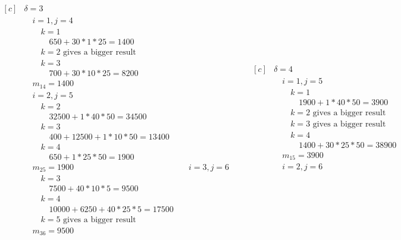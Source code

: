 \documentclass[a4paper]{article}
\begin{document}
\begin{enumerate}
  \begin{equation*}
    \begin{aligned}[c]
      &\delta=3 \\
      &\quad i=1, j=4 \\
      &\quad \quad k=1 \\
      &\quad \quad \quad 650 + 30*1*25=1400 \\
      &\quad \quad k=2 \text{ gives a bigger result} \\
      &\quad \quad k=3 \\
      &\quad \quad \quad 700+30*10*25=8200 \\
      &\quad m_{14} = 1400 \\
      &\quad i=2, j=5 \\
      &\quad \quad k=2 \\
      &\quad \quad \quad 32500+1*40*50=34500 \\
      &\quad \quad k=3 \\
      &\quad \quad \quad 400+12500+1*10*50=13400 \\
      &\quad \quad k=4 \\
      &\quad \quad \quad 650+1*25*50=1900 \\
      &\quad m_{25}=1900
      &\quad i=3, j=6 \\
      &\quad \quad k=3 \\
      &\quad \quad \quad 7500+40*10*5=9500 \\
      &\quad \quad k=4 \\
      &\quad \quad \quad 10000+6250+40*25*5=17500 \\
      &\quad \quad k=5 \text{ gives a bigger result} \\
      &\quad m_{36}=9500
    \end{aligned}
    \quad \quad
    \begin{aligned}[c]
      &\delta=4 \\
      &\quad i=1, j=5 \\
      &\quad \quad k=1 \\
      &\quad \quad \quad 1900+1*40*50=3900 \\
      &\quad \quad k=2 \text{ gives a bigger result} \\
      &\quad \quad k=3 \text{ gives a bigger result} \\
      &\quad \quad k=4 \\
      &\quad \quad \quad 1400+30*25*50=38900 \\
      &\quad m_{15} = 3900 \\
      &\quad i=2, j=6 \\

\end{aligned}
\end{equation*}
\end{enumerate}
\end{document}
